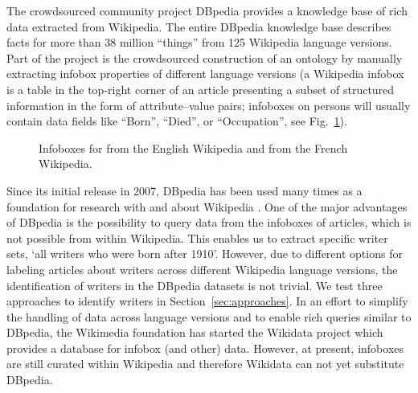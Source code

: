 \documentclass[a4paper,12pt]{scrartcl}
\begin{document}
The crowdsourced community project DBpedia
\cite{Auer2007dbpediaNucleus} provides a knowledge base of rich data
extracted from Wikipedia.
The entire DBpedia knowledge base describes facts for more than 38
million ``things'' from 125 Wikipedia language versions. Part of the
project is the crowdsourced construction of an ontology by manually
extracting infobox properties of different language versions (a
Wikipedia infobox is a table in the top-right corner of an article
presenting a subset of structured information in the form of
attribute--value pairs; \eg infoboxes on persons will usually contain
data fields like ``Born'', ``Died'', or ``Occupation'', see
Fig.~\ref{fig:shakespeare}).
%
\begin{figure}
  \centering
   \hspace{2em} %
  \caption{Infoboxes for  from the English Wikipedia and  from the French Wikipedia.}
  \label{fig:shakespeare}
\end{figure}
%
Since its initial release in 2007, DBpedia has been used many times as
a foundation for research with and about Wikipedia
\cite{nitzschke2012academicImpact}.
%
%
One of the major advantages of DBpedia is the possibility to query
data from the infoboxes of articles, which is not possible from within
Wikipedia. This enables us to extract specific writer sets, \eg `all
writers who were born after 1910'.
%
However, due to different options for labeling articles about writers
across different Wikipedia language versions, the
identification of writers in the DBpedia datasets is not
trivial. We test three approaches to identify writers in
Section~\ref{sec:approaches}.
%
In an effort to simplify the handling of data across language versions
and to enable rich queries similar to DBpedia, the Wikimedia
foundation has started the Wikidata project
\cite{vrandecic2012wikidata} which provides a database for infobox
(and other) data. However, at present, infoboxes are still curated
within Wikipedia and therefore Wikidata can not yet substitute
DBpedia.
\end{document}
